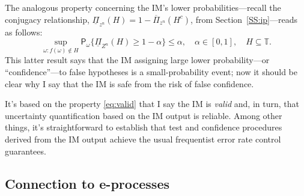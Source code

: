 \documentclass[a4paper, 12pt]{article}
\theoremstyle{plain}
\theoremstyle{definition}
\theoremstyle{remark}
\newcommand{\prob}{\mathsf{P}}
\newcommand{\TT}{\mathbb{T}}
\newcommand{\lPi}{\underline{\Pi}}
\newcommand{\uPi}{\overline{\Pi}}
\begin{document}
The analogous property concerning the IM's lower probabilities---recall the conjugacy relationship, $\lPi_{z^n}(H) = 1 - \uPi_{z^n}(H^c)$, from Section~\ref{SS:ip}---reads as follows: 
\[ \sup_{\omega: f(\omega) \not\in H} \prob_\omega\{ \lPi_{Z^n}(H) \geq 1-\alpha \} \leq \alpha, \quad \alpha \in [0,1], \quad H \subseteq \TT. \]
This latter result says that the IM assigning large lower probability---or ``confidence''---to false hypotheses is a small-probability event; now it should be clear why I say that the IM is safe from the risk of false confidence.  

It's based on the property \eqref{eq:valid} that I say the IM is {\em valid} and, in turn, that uncertainty quantification based on the IM output is reliable.  Among other things, it's straightforward to establish that test and confidence procedures derived from the IM output achieve the usual frequentist error rate control guarantees.  




\subsection{Connection to e-processes}
\label{SS:im.e}
\end{document}
